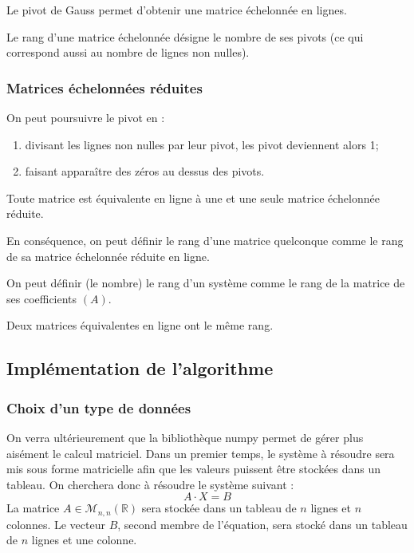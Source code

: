 {\begin{proposition}
Le pivot de Gauss permet d'obtenir une matrice échelonnée en lignes. 
\end{proposition}

\begin{defi}{}
Le rang d'une matrice échelonnée désigne le nombre de ses pivots (ce qui correspond aussi au nombre de lignes non nulles). 
\end{defi}

\subsubsection{Matrices échelonnées réduites}
On peut poursuivre le pivot en : 
\begin{enumerate}
\item divisant les lignes non nulles par leur pivot, les pivot deviennent alors 1;
\item faisant apparaître des zéros au dessus des pivots. 
\end{enumerate}

\begin{proposition}
Toute matrice est équivalente en ligne à une et une seule matrice échelonnée réduite. 

En conséquence, on peut définir le rang d'une matrice quelconque comme le rang de sa matrice échelonnée réduite en ligne. 

On peut définir (le nombre) le rang d'un système comme le rang de la matrice de ses coefficients $(A)$. 
\end{proposition}

\begin{remarque}
Deux matrices équivalentes en ligne ont le même rang. 
\end{remarque}

\subsection{Implémentation de l'algorithme}

\subsubsection{Choix d'un type de données}
On verra ultérieurement que la bibliothèque numpy permet de gérer plus aisément le calcul matriciel. Dans un premier temps, le système à résoudre sera mis sous forme matricielle afin que les valeurs puissent être stockées dans un tableau. 
On cherchera donc à résoudre le système suivant :
$$
A\cdot X = B
$$
La matrice $A\in\mathcal{M}_{n,n}(\mathbb{R})$ sera stockée dans un tableau de $n$ lignes et $n$ colonnes. Le vecteur $B$, second membre de l'équation, sera stocké dans un tableau de $n$ lignes et une colonne. 


}
